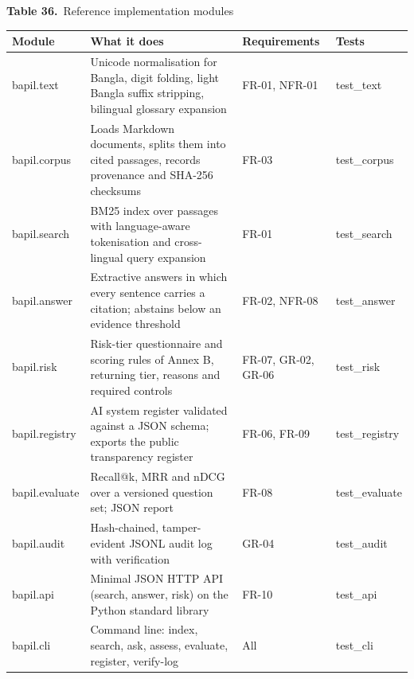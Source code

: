 \documentclass[border=10pt]{standalone}
\begin{document}
\begin{minipage}{17cm}
{\large\bfseries Table 36.}\ {\large Reference implementation modules}\par\vspace{7pt}
\small
{}
\begin{tabularx}{\linewidth}{@{}>{\hsize=0.819\hsize\raggedright\arraybackslash}X>{\hsize=1.735\hsize\raggedright\arraybackslash}X>{\hsize=0.771\hsize\raggedright\arraybackslash}X>{\hsize=0.675\hsize\raggedright\arraybackslash}X@{}}
\arrayrulecolor{bapilrule}\toprule
\rowcolor{white}\textbf{Module} & \textbf{What it does} & \textbf{Requirements} & \textbf{Tests} \\
\midrule
bapil.text & Unicode normalisation for Bangla, digit folding, light Bangla suffix stripping, bilingual glossary expansion & FR-01, NFR-01 & test\_text \\
bapil.corpus & Loads Markdown documents, splits them into cited passages, records provenance and SHA-256 checksums & FR-03 & test\_corpus \\
bapil.search & BM25 index over passages with language-aware tokenisation and cross-lingual query expansion & FR-01 & test\_search \\
bapil.answer & Extractive answers in which every sentence carries a citation; abstains below an evidence threshold & FR-02, NFR-08 & test\_answer \\
bapil.risk & Risk-tier questionnaire and scoring rules of Annex B, returning tier, reasons and required controls & FR-07, GR-02, GR-06 & test\_risk \\
bapil.registry & AI system register validated against a JSON schema; exports the public transparency register & FR-06, FR-09 & test\_registry \\
bapil.evaluate & Recall@k, MRR and nDCG over a versioned question set; JSON report & FR-08 & test\_evaluate \\
bapil.audit & Hash-chained, tamper-evident JSONL audit log with verification & GR-04 & test\_audit \\
bapil.api & Minimal JSON HTTP API (search, answer, risk) on the Python standard library & FR-10 & test\_api \\
bapil.cli & Command line: index, search, ask, assess, evaluate, register, verify-log & All & test\_cli \\
\bottomrule
\end{tabularx}
\par{}
\end{minipage}
\end{document}
